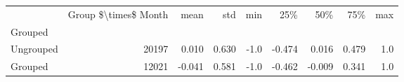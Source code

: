 \begin{tabular}{lrrrrrrrr}
\toprule
{} &  Group \$\textbackslash times\$ Month &   mean &    std &  min &    25\% &    50\% &    75\% &  max \\
Grouped   &                       &        &        &      &        &        &        &      \\
\midrule
Ungrouped &                 20197 &  0.010 &  0.630 & -1.0 & -0.474 &  0.016 &  0.479 &  1.0 \\
Grouped   &                 12021 & -0.041 &  0.581 & -1.0 & -0.462 & -0.009 &  0.341 &  1.0 \\
\bottomrule
\end{tabular}

